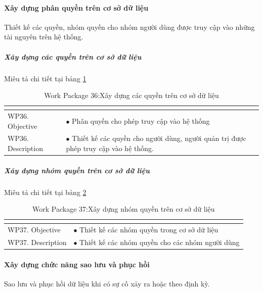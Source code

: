 \documentclass[a4paper]{book}
\begin{document}
\paragraph{Xây dựng phân quyền trên cơ sở dữ liệu}
Thiết kế các quyền, nhóm quyền cho nhóm người dùng được truy cập vào những tài nguyên trên hệ thống.
\subparagraph{Xây dựng các quyền trên cơ sở dữ liệu} Miêu tả chi tiết tại bảng \ref{table:xd_cacquyen}
\begin{table}[h!]
	\begin{center}
		\begin{tabular}{|p{4cm}|p{10cm}|}
			\hline
			\multicolumn{2}{|c|}{\cellcolor[HTML]{363636}{\color[HTML]{FFFFFF}Work package 36: Xây dựng các quyền trên cơ sở dữ liệu}}\\
			\hline
			\multirow{1}{*}{WP36. Objective} & $\bullet$ Phân quyền cho phép truy cập vào hệ thống\\
			\hline
			\multirow{1}{*}{WP36. Description} & $\bullet$ Thiết kế các quyền cho người dùng, người quản trị được phép truy cập vào hệ thống. \\
			\hline
		\end{tabular}
		\caption{Work Package 36:Xây dựng các quyền trên cơ sở dữ liệu}
		\label{table:xd_cacquyen}
	\end{center}
\end{table}
\subparagraph{Xây dựng nhóm quyền trên cơ sở dữ liệu} Miêu tả chi tiết tại bảng \ref{table:xd_nhomquyen}
\begin{table}[h!]
	\begin{center}
		\begin{tabular}{|p{4cm}|p{10cm}|}
			\hline
			\multicolumn{2}{|c|}{\cellcolor[HTML]{363636}{\color[HTML]{FFFFFF}Work package 37: Xây dựng nhóm quyền trên cơ sở dữ liệu}}\\
			\hline
			\multirow{1}{*}{WP37. Objective} & $\bullet$ Thiết kế các nhóm quyền trong cơ sở dữ liệu\\
			\hline
			\multirow{1}{*}{WP37. Description} & $\bullet$ Thiết kế các nhóm quyền cho các nhóm người dùng \\
			\hline
		\end{tabular}
		\caption{Work Package 37:Xây dựng nhóm quyền trên cơ sở dữ liệu}
		\label{table:xd_nhomquyen}
	\end{center}
\end{table}
\paragraph{Xây dựng chức năng sao lưu và phục hồi} Sao lưu và phục hồi dữ liệu khi có sự cố xảy ra hoặc theo định kỳ.
\end{document}
